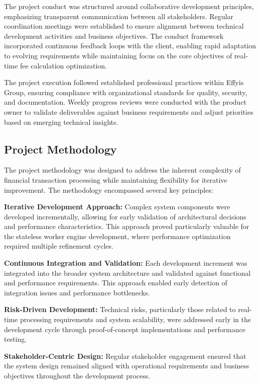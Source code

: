 The project conduct was structured around collaborative development principles, emphasizing transparent communication between all stakeholders. Regular coordination meetings were established to ensure alignment between technical development activities and business objectives. The conduct framework incorporated continuous feedback loops with the client, enabling rapid adaptation to evolving requirements while maintaining focus on the core objectives of real-time fee calculation optimization.

The project execution followed established professional practices within Effyis Group, ensuring compliance with organizational standards for quality, security, and documentation. Weekly progress reviews were conducted with the product owner to validate deliverables against business requirements and adjust priorities based on emerging technical insights.

\subsection{Project Methodology}

The project methodology was designed to address the inherent complexity of financial transaction processing while maintaining flexibility for iterative improvement. The methodology encompassed several key principles:

\textbf{Iterative Development Approach:} Complex system components were developed incrementally, allowing for early validation of architectural decisions and performance characteristics. This approach proved particularly valuable for the stateless worker engine development, where performance optimization required multiple refinement cycles.

\textbf{Continuous Integration and Validation:} Each development increment was integrated into the broader system architecture and validated against functional and performance requirements. This approach enabled early detection of integration issues and performance bottlenecks.

\textbf{Risk-Driven Development:} Technical risks, particularly those related to real-time processing requirements and system scalability, were addressed early in the development cycle through proof-of-concept implementations and performance testing.

\textbf{Stakeholder-Centric Design:} Regular stakeholder engagement ensured that the system design remained aligned with operational requirements and business objectives throughout the development process.

